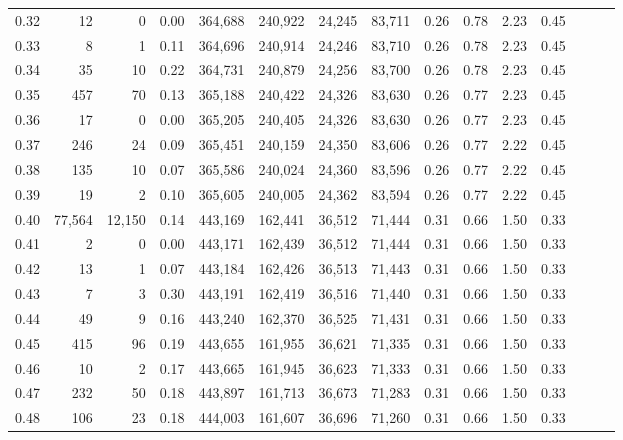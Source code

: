 \begin{tabular}{rrrrrrrrrrrrrrr}
0.32 &      12 &       0 &  0.00 &  364,688 &  240,922 &   24,245 &   83,711 &  0.26 &  0.78 &  2.23 &      0.45 \\
0.33 &       8 &       1 &  0.11 &  364,696 &  240,914 &   24,246 &   83,710 &  0.26 &  0.78 &  2.23 &      0.45 \\
0.34 &      35 &      10 &  0.22 &  364,731 &  240,879 &   24,256 &   83,700 &  0.26 &  0.78 &  2.23 &      0.45 \\
0.35 &     457 &      70 &  0.13 &  365,188 &  240,422 &   24,326 &   83,630 &  0.26 &  0.77 &  2.23 &      0.45 \\
0.36 &      17 &       0 &  0.00 &  365,205 &  240,405 &   24,326 &   83,630 &  0.26 &  0.77 &  2.23 &      0.45 \\
0.37 &     246 &      24 &  0.09 &  365,451 &  240,159 &   24,350 &   83,606 &  0.26 &  0.77 &  2.22 &      0.45 \\
0.38 &     135 &      10 &  0.07 &  365,586 &  240,024 &   24,360 &   83,596 &  0.26 &  0.77 &  2.22 &      0.45 \\
0.39 &      19 &       2 &  0.10 &  365,605 &  240,005 &   24,362 &   83,594 &  0.26 &  0.77 &  2.22 &      0.45 \\
0.40 &  77,564 &  12,150 &  0.14 &  443,169 &  162,441 &   36,512 &   71,444 &  0.31 &  0.66 &  1.50 &      0.33 \\
0.41 &       2 &       0 &  0.00 &  443,171 &  162,439 &   36,512 &   71,444 &  0.31 &  0.66 &  1.50 &      0.33 \\
0.42 &      13 &       1 &  0.07 &  443,184 &  162,426 &   36,513 &   71,443 &  0.31 &  0.66 &  1.50 &      0.33 \\
0.43 &       7 &       3 &  0.30 &  443,191 &  162,419 &   36,516 &   71,440 &  0.31 &  0.66 &  1.50 &      0.33 \\
0.44 &      49 &       9 &  0.16 &  443,240 &  162,370 &   36,525 &   71,431 &  0.31 &  0.66 &  1.50 &      0.33 \\
0.45 &     415 &      96 &  0.19 &  443,655 &  161,955 &   36,621 &   71,335 &  0.31 &  0.66 &  1.50 &      0.33 \\
0.46 &      10 &       2 &  0.17 &  443,665 &  161,945 &   36,623 &   71,333 &  0.31 &  0.66 &  1.50 &      0.33 \\
0.47 &     232 &      50 &  0.18 &  443,897 &  161,713 &   36,673 &   71,283 &  0.31 &  0.66 &  1.50 &      0.33 \\
0.48 &     106 &      23 &  0.18 &  444,003 &  161,607 &   36,696 &   71,260 &  0.31 &  0.66 &  1.50 &      0.33 \\

\end{tabular}
